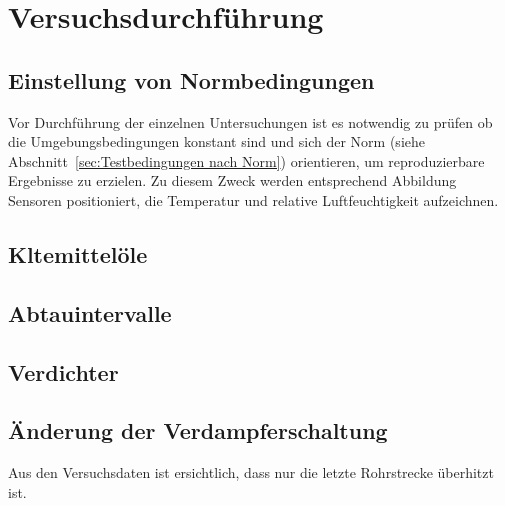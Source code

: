 \chapter{Versuchsdurchführung}
\label{cha:Versuchsdurchführung}

\section{Einstellung von Normbedingungen}
\label{sec:Einstellung von Normbedingungen}

Vor Durchführung der einzelnen Untersuchungen ist es notwendig zu prüfen ob die Umgebungsbedingungen konstant sind und sich der Norm (siehe Abschnitt~\ref{sec:Testbedingungen nach Norm}) orientieren, um reproduzierbare Ergebnisse zu erzielen. Zu diesem Zweck werden entsprechend Abbildung~ Sensoren positioniert, die Temperatur und relative Luftfeuchtigkeit aufzeichnen. 

\section{Kltemittelöle}
\label{sec:Kältemitteloele}

\section{Abtauintervalle}
\label{sec:Abtauintervalle}

\section{Verdichter}
\label{sec:Verdichter}

\section{Änderung der Verdampferschaltung}
\label{sec:Änderung der Verdampferschaltung}















Aus den Versuchsdaten ist ersichtlich, dass nur die letzte Rohrstrecke überhitzt ist.

